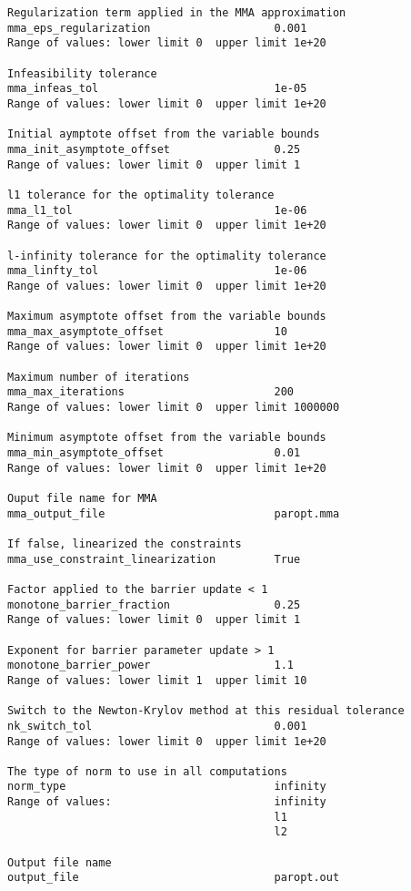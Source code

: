 \documentclass[12pt]{article}
\begin{document}
{\begin{verbatim}
Regularization term applied in the MMA approximation
mma_eps_regularization                   0.001
Range of values: lower limit 0  upper limit 1e+20

Infeasibility tolerance
mma_infeas_tol                           1e-05
Range of values: lower limit 0  upper limit 1e+20

Initial aymptote offset from the variable bounds
mma_init_asymptote_offset                0.25
Range of values: lower limit 0  upper limit 1

l1 tolerance for the optimality tolerance
mma_l1_tol                               1e-06
Range of values: lower limit 0  upper limit 1e+20

l-infinity tolerance for the optimality tolerance
mma_linfty_tol                           1e-06
Range of values: lower limit 0  upper limit 1e+20

Maximum asymptote offset from the variable bounds
mma_max_asymptote_offset                 10
Range of values: lower limit 0  upper limit 1e+20

Maximum number of iterations
mma_max_iterations                       200
Range of values: lower limit 0  upper limit 1000000

Minimum asymptote offset from the variable bounds
mma_min_asymptote_offset                 0.01
Range of values: lower limit 0  upper limit 1e+20

Ouput file name for MMA
mma_output_file                          paropt.mma

If false, linearized the constraints
mma_use_constraint_linearization         True

Factor applied to the barrier update < 1
monotone_barrier_fraction                0.25
Range of values: lower limit 0  upper limit 1

Exponent for barrier parameter update > 1
monotone_barrier_power                   1.1
Range of values: lower limit 1  upper limit 10

Switch to the Newton-Krylov method at this residual tolerance
nk_switch_tol                            0.001
Range of values: lower limit 0  upper limit 1e+20

The type of norm to use in all computations
norm_type                                infinity
Range of values:                         infinity
                                         l1
                                         l2

Output file name
output_file                              paropt.out


\end{verbatim}}
\end{document}
